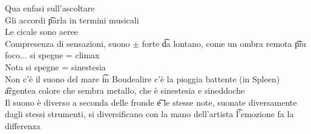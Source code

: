 \documentclass[12pt]{article}
\begin{document}
Qua enfasi sull'ascoltare \\
Gli accordi \t parla in termini musicali \\
Le cicale sono aeree \\
Compresenza di sensazioni, suono $\pm$ forte \t da lontano, come un ombra remota \t piu foco... si spegne = climax \\
Nota si spegne = sinestesia \\
Non c'è il suono del mare \t in Boudealire c'è la pioggia battente (in Spleen) \t argentea colore che sembra metallo, che è sinestesia e sineddoche \\
Il suono è diverso a seconda delle fronde \t e le stesse note, suonate diversamente dagli stessi strumenti, si diversificano con la mano dell'artista \t l'emozione fa la differenza
\end{document}
